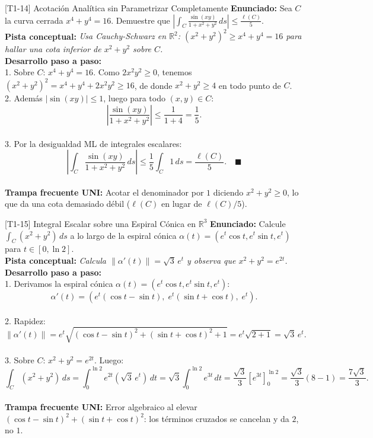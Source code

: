 \documentclass[11pt,a4paper]{article}
\begin{document}
\begin{ejerciciobox}{[T1-14] Acotación Analítica sin Parametrizar Completamente}
\textbf{Enunciado:} Sea $C$ la curva cerrada $x^4 + y^4 = 16$. Demuestre que $\left|\int_C \frac{\sin(xy)}{1 + x^2 + y^2}\,ds\right| \le \frac{\ell(C)}{5}$.\\[0.2cm]
\textbf{Pista conceptual:} \emph{Usa Cauchy-Schwarz en $\mathbb{R}^2$: $(x^2+y^2)^2 \ge x^4 + y^4 = 16$ para hallar una cota inferior de $x^2+y^2$ sobre $C$.}\\[0.2cm]
\textbf{Desarrollo paso a paso:}\\
1. Sobre $C$: $x^4 + y^4 = 16$. Como $2x^2y^2 \ge 0$, tenemos $(x^2+y^2)^2 = x^4 + y^4 + 2x^2y^2 \ge 16$, de donde $x^2 + y^2 \ge 4$ en todo punto de $C$.\\
2. Además $|\sin(xy)| \le 1$, luego para todo $(x,y) \in C$:\\
$$\left|\frac{\sin(xy)}{1 + x^2 + y^2}\right| \le \frac{1}{1 + 4} = \frac{1}{5}.$$\\
3. Por la desigualdad ML de integrales escalares:\\
$$\left|\int_C \frac{\sin(xy)}{1 + x^2 + y^2}\,ds\right| \le \frac{1}{5}\int_C 1\,ds = \frac{\ell(C)}{5}. \quad \blacksquare$$\\[0.2cm]
\textbf{Trampa frecuente UNI:} Acotar el denominador por $1$ diciendo $x^2+y^2 \ge 0$, lo que da una cota demasiado débil ($\ell(C)$ en lugar de $\ell(C)/5$).
\end{ejerciciobox}

\begin{ejerciciobox}{[T1-15] Integral Escalar sobre una Espiral Cónica en $\mathbb{R}^3$}
\textbf{Enunciado:} Calcule $\int_C (x^2+y^2)\,ds$ a lo largo de la espiral cónica $\alpha(t) = (e^t\cos t, e^t\sin t, e^t)$ para $t \in [0, \ln 2]$.\\[0.2cm]
\textbf{Pista conceptual:} \emph{Calcula $\|\alpha'(t)\| = \sqrt{3}\,e^t$ y observa que $x^2+y^2 = e^{2t}$.}\\[0.2cm]
\textbf{Desarrollo paso a paso:}\\
1. Derivamos la espiral cónica $\alpha(t) = (e^t\cos t, e^t\sin t, e^t)$:\\
$$\alpha'(t) = (e^t(\cos t - \sin t),\; e^t(\sin t + \cos t),\; e^t).$$\\
2. Rapidez:\\
$$\|\alpha'(t)\| = e^t\sqrt{(\cos t-\sin t)^2 + (\sin t+\cos t)^2 + 1} = e^t\sqrt{2 + 1} = \sqrt{3}\,e^t.$$\\
3. Sobre $C$: $x^2 + y^2 = e^{2t}$. Luego:\\
$$\int_C (x^2+y^2)\,ds = \int_0^{\ln 2} e^{2t}(\sqrt{3}\,e^t)\,dt = \sqrt{3}\int_0^{\ln 2} e^{3t}\,dt = \frac{\sqrt{3}}{3}\left[e^{3t}\right]_0^{\ln 2} = \frac{\sqrt{3}}{3}(8 - 1) = \frac{7\sqrt{3}}{3}.$$\\[0.2cm]
\textbf{Trampa frecuente UNI:} Error algebraico al elevar $(\cos t - \sin t)^2 + (\sin t + \cos t)^2$: los términos cruzados se cancelan y da $2$, no $1$.
\end{ejerciciobox}
\end{document}
